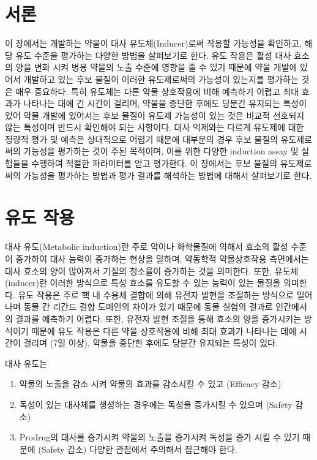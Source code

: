 \documentclass[
  11pt,
  krantz2, a4paper, twoside]{krantz}
\providecommand{\tightlist}{%
  \setlength{\itemsep}{0pt}\setlength{\parskip}{0pt}}
\begin{document}
\section{서론}\label{uxc11cuxb860-5}

이 장에서는 개발하는 약물이 대사 유도체(Inducer)로써 작용할 가능성을 확인하고, 해당 유도 수준을 평가하는 다양한 방법을 살펴보기로 한다.
유도 작용은 활성 대사 효소의 양을 변화 시켜 병용 약물의 노출 수준에 영향을 줄 수 있기 때문에 약물 개발에 있어서 개발하고 있는 후보 물질이
이러한 유도제로써의 가능성이 있는지를 평가하는 것은 매우 중요하다. 특히 유도체는 다른 약물 상호작용에 비해 예측하기 어렵고 최대 효과가
나타나는 대에 긴 시간이 걸리며, 약물을 중단한 후에도 당분간 유지되는 특성이 있어 약물 개발에 있어서는 후보 물질이 유도제 가능성이
있는 것은 비교적 선호되지 않는 특성이며 반드시 확인해야 되는 사항이다.
대사 억제와는 다르게 유도제에 대한 정량적 평가 및 예측은 상대적으로 어렵기 때문에 대부분의 경우 후보 물질의 유도제로써의 가능성을 평가하는 것이
주된 목적이며, 이를 위한 다양한 induction assay 및 실험들을 수행하여 적절한 파라미터를 얻고 평가한다.
이 장에서는 후보 물질의 유도제로써의 가능성을 평가하는 방법과 평가 결과를 해석하는 방법에 대해서 살펴보기로 한다.

\section{유도 작용}\label{uxc720uxb3c4-uxc791uxc6a9}

대사 유도(Metabolic induction)란 주로 약이나 화학물질에 의해서 효소의 활성 수준이 증가하여 대사 능력이 증가하는 현상을 말하며,
약동학적 약물상호작용 측면에서는 대사 효소의 양이 많아져서 기질의 청소율이 증가하는 것을 의미한다. 또한, 유도체(inducer)란 이러한 방식으로
특성 효소를 유도할 수 있는 능력이 있는 물질을 의미한다. 유도 작용은 주로 핵 내 수용체 결합에 의해 유전자 발현을 조절하는 방식으로 일어나며
동물 간 리간드 결합 도메인의 차이가 있기 때문에 동물 실험의 결과로 인간에서의 결과를 예측하기 어렵다.
또한, 유전자 발현 조절을 통해 효소의 양을 증가시키는 방식이기 때문에 유도 작용은 다른 약물 상호작용에 비해 최대 효과가 나타나는 데에 시간이 걸리며
(7일 이상), 약물을 중단한 후에도 당분간 유지되는 특성이 있다.

대사 유도는

\begin{enumerate}
\def\labelenumi{\arabic{enumi})}
\tightlist
\item
  약물의 노출을 감소 시켜 약물의 효과를 감소시킬 수 있고 (Efficacy 감소)
\item
  독성이 있는 대사체를 생성하는 경우에는 독성을 증가시킬 수 있으며 (Safety 감소)
\item
  Prodrug의 대사를 증가시켜 약물의 노출을 증가시켜 독성을 증가 시킬 수 있기 때문에 (Safety 감소) 다양한 관점에서 주의해서
  접근해야 한다.
\end{enumerate}
\end{document}
